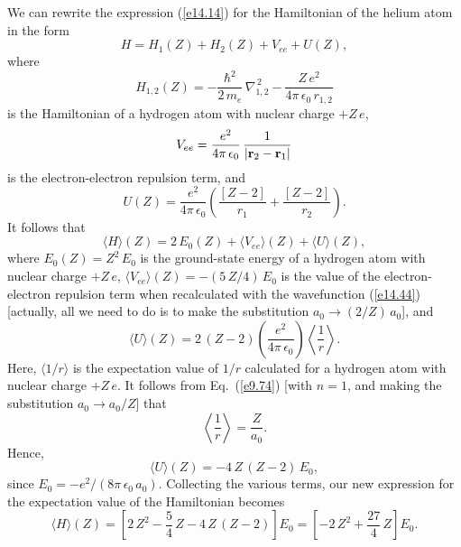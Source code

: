 We can rewrite the expression (\ref{e14.14}) for the Hamiltonian
of the helium atom in the form
\begin{equation}
H = H_1(Z) + H_2(Z) + V_{ee} + U(Z),
\end{equation}
where
\begin{equation}
H_{1,2}(Z) = -\frac{\hbar^2}{2\,m_e}\,\nabla^{\,2}_{1,2} -\frac{Z\,e^2}{4\pi\,\epsilon_0\,r_{1,2}}
\end{equation}
is the Hamiltonian of a hydrogen atom with nuclear charge $+Z\,e$,
\begin{equation}
V_{ee} = \frac{e^2}{4\pi\,\epsilon_0}\,\frac{1}{|{\bf r}_2-{\bf r}_1|}
\end{equation}
is the electron-electron repulsion term, and
\begin{equation}
U(Z) = \frac{e^2}{4\pi\,\epsilon_0}\left(\frac{[Z-2]}{r_1} + \frac{[Z-2]}{r_2}\right).
\end{equation}
It follows that
\begin{equation}
\langle H\rangle (Z)= 2\,E_0(Z) + \langle V_{ee}\rangle(Z) + \langle U\rangle(Z),
\end{equation}
where $E_0(Z) = Z^2\,E_0$ is the ground-state energy of a hydrogen
atom with nuclear charge $+Z\,e$, $\langle V_{ee}\rangle(Z) = -(5\,Z/4)\,E_0$ is the value of the electron-electron repulsion term when
recalculated with the wavefunction (\ref{e14.44}) [actually, all we
need to do is to make the substitution $a_0\rightarrow (2/Z)\,a_0$], and
\begin{equation}
\langle U\rangle(Z) = 2\,(Z-2)\left(\frac{e^2}{4\pi\,\epsilon_0}\right)\left\langle\frac{1}{r}\right\rangle.
\end{equation}
Here, $\langle 1/r\rangle$ is the expectation value of $1/r$ calculated
for a hydrogen atom with nuclear charge $+Z\,e$. It follows from
Eq.~(\ref{e9.74}) [with $n=1$, and making the substitution $a_0\rightarrow a_0/Z$] that
\begin{equation}
\left\langle \frac{1}{r}\right\rangle = \frac{Z}{a_0}.
\end{equation}
Hence,
\begin{equation}
\langle U\rangle(Z) = -4\,Z\,(Z-2)\,E_0,
\end{equation}
since $E_0=-e^2/(8\pi\,\epsilon_0\,a_0)$. 
Collecting the various terms, our new expression for the expectation
value of the Hamiltonian becomes
\begin{equation}
\langle H\rangle(Z) = \left[2\,Z^2 - \frac{5}{4}\,Z - 4\,Z\,(Z-2)\right] E_0
= \left[-2\,Z^2+ \frac{27}{4}\,Z\right] E_0.
\end{equation}
